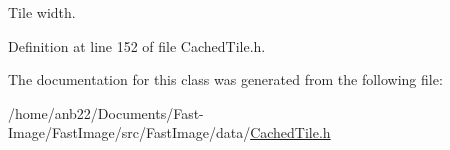 Tile width. 



Definition at line 152 of file Cached\+Tile.\+h.



The documentation for this class was generated from the following file\+:\begin{DoxyCompactItemize}
\item 
/home/anb22/\+Documents/\+Fast-\/\+Image/\+Fast\+Image/src/\+Fast\+Image/data/\hyperlink{CachedTile_8h}{Cached\+Tile.\+h}\end{DoxyCompactItemize}
